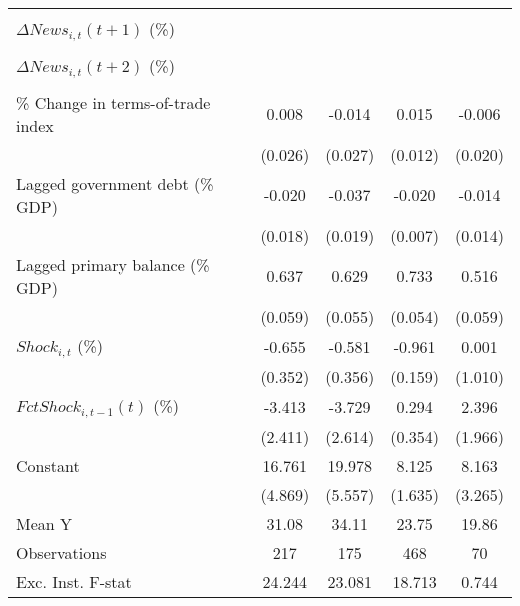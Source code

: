 {\begin{tabular}{l*{4}{c}}
                    &                     &                     &                     &                     \\
\addlinespace
$ \Delta News_{i,t}(t+1)$ (\%)&                     &                     &                     &                     \\
                    &                     &                     &                     &                     \\
\addlinespace
$ \Delta News_{i,t}(t+2)$ (\%)&                     &                     &                     &                     \\
                    &                     &                     &                     &                     \\
\addlinespace
\% Change in terms-of-trade index&       0.008         &      -0.014         &       0.015         &      -0.006         \\
                    &     (0.026)         &     (0.027)         &     (0.012)         &     (0.020)         \\
\addlinespace
Lagged government debt (\% GDP)&      -0.020         &      -0.037\sym{*}  &      -0.020\sym{**} &      -0.014         \\
                    &     (0.018)         &     (0.019)         &     (0.007)         &     (0.014)         \\
\addlinespace
Lagged primary balance (\% GDP)&       0.637\sym{***}&       0.629\sym{***}&       0.733\sym{***}&       0.516\sym{***}\\
                    &     (0.059)         &     (0.055)         &     (0.054)         &     (0.059)         \\
\addlinespace
$ Shock_{i,t}$ (\%) &      -0.655\sym{*}  &      -0.581         &      -0.961\sym{***}&       0.001         \\
                    &     (0.352)         &     (0.356)         &     (0.159)         &     (1.010)         \\
\addlinespace
$ FctShock_{i,t-1}(t)$ (\%)&      -3.413         &      -3.729         &       0.294         &       2.396         \\
                    &     (2.411)         &     (2.614)         &     (0.354)         &     (1.966)         \\
\addlinespace
Constant            &      16.761\sym{***}&      19.978\sym{***}&       8.125\sym{***}&       8.163\sym{**} \\
                    &     (4.869)         &     (5.557)         &     (1.635)         &     (3.265)         \\
\midrule
Mean Y              &       31.08         &       34.11         &       23.75         &       19.86         \\
Observations        &         217         &         175         &         468         &          70         \\
Exc. Inst. F-stat   &      24.244         &      23.081         &      18.713         &       0.744         \\
\bottomrule
\end{tabular}
}
